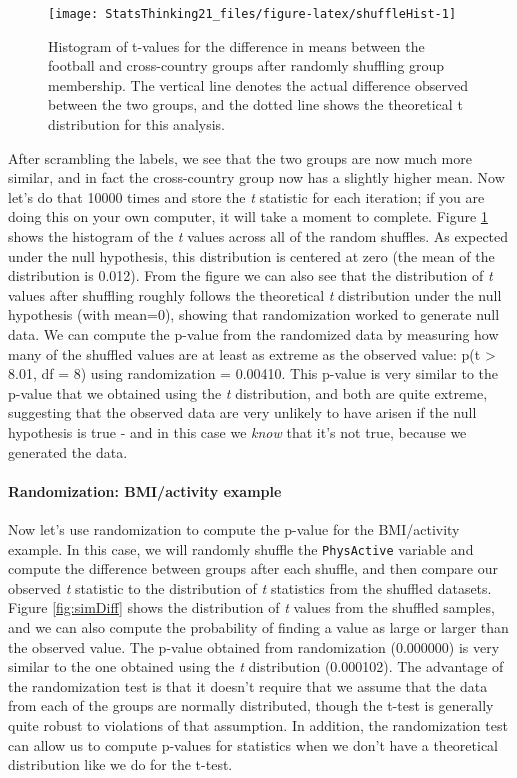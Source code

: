 \documentclass[12pt,]{book}
\let\oldparagraph\paragraph
\renewcommand{\paragraph}[1]{\oldparagraph{#1}\mbox{}}
\theoremstyle{definition}
\theoremstyle{definition}
\theoremstyle{definition}
\theoremstyle{remark}
\begin{document}
\begin{figure}
\texttt{[image: StatsThinking21\_files/figure-latex/shuffleHist-1]} \caption{Histogram of t-values for the difference in means between the football and cross-country groups after randomly shuffling group membership.  The vertical line denotes the actual difference observed between the two groups, and the dotted line shows the theoretical t distribution for this analysis.}\label{fig:shuffleHist}
\end{figure}

After scrambling the labels, we see that the two groups are now much more similar, and in fact the cross-country group now has a slightly higher mean. Now let's do that 10000 times and store the \emph{t} statistic for each iteration; if you are doing this on your own computer, it will take a moment to complete. Figure \ref{fig:shuffleHist} shows the histogram of the \emph{t} values across all of the random shuffles. As expected under the null hypothesis, this distribution is centered at zero (the mean of the distribution is 0.012). From the figure we can also see that the distribution of \emph{t} values after shuffling roughly follows the theoretical \emph{t} distribution under the null hypothesis (with mean=0), showing that randomization worked to generate null data. We can compute the p-value from the randomized data by measuring how many of the shuffled values are at least as extreme as the observed value: p(t \textgreater{} 8.01, df = 8) using randomization = 0.00410. This p-value is very similar to the p-value that we obtained using the \emph{t} distribution, and both are quite extreme, suggesting that the observed data are very unlikely to have arisen if the null hypothesis is true - and in this case we \emph{know} that it's not true, because we generated the data.

\hypertarget{randomization-bmiactivity-example}{%
\paragraph{Randomization: BMI/activity example}\label{randomization-bmiactivity-example}}

Now let's use randomization to compute the p-value for the BMI/activity example. In this case, we will randomly shuffle the \texttt{PhysActive} variable and compute the difference between groups after each shuffle, and then compare our observed \emph{t} statistic to the distribution of \emph{t} statistics from the shuffled datasets. Figure \ref{fig:simDiff} shows the distribution of \emph{t} values from the shuffled samples, and we can also compute the probability of finding a value as large or larger than the observed value. The p-value obtained from randomization (0.000000) is very similar to the one obtained using the \emph{t} distribution (0.000102). The advantage of the randomization test is that it doesn't require that we assume that the data from each of the groups are normally distributed, though the t-test is generally quite robust to violations of that assumption. In addition, the randomization test can allow us to compute p-values for statistics when we don't have a theoretical distribution like we do for the t-test.
\end{document}
